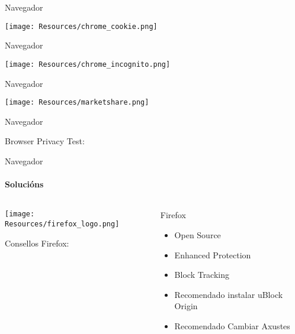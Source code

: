 \documentclass{beamer}
\begin{document}

\begin{frame}{Navegador}
  \subtitle{Problema}
  \texttt{[image: Resources/chrome\_cookie.png]}

\end{frame}

\begin{frame}{Navegador}
  \subtitle{Problema}
  \texttt{[image: Resources/chrome\_incognito.png]}

\end{frame}

\begin{frame}{Navegador}
  \subtitle{Problema}
  \texttt{[image: Resources/marketshare.png]}

\end{frame}

\begin{frame}{Navegador}
  \subtitle{Problema}

  Browser Privacy Test:\quad
  \qquad

\end{frame}




\begin{frame}{Navegador}
  \framesubtitle{Solucións}

  \begin{columns}
    \begin{column}{0.5\textwidth}
      \texttt{[image: Resources/firefox\_logo.png]}

      \vspace{1cm}

      Consellos Firefox:\quad

    \end{column}

    \begin{column}{0.4\textwidth}
      \begin{block}{Firefox}
        \begin{itemize}
          \item Open Source
          \item Enhanced Protection
          \item Block Tracking
          \item Recomendado instalar uBlock Origin
          \item Recomendado Cambiar Axustes
        \end{itemize}
      \end{block}

    \end{column}

  \end{columns}

\end{frame}
\end{document}
